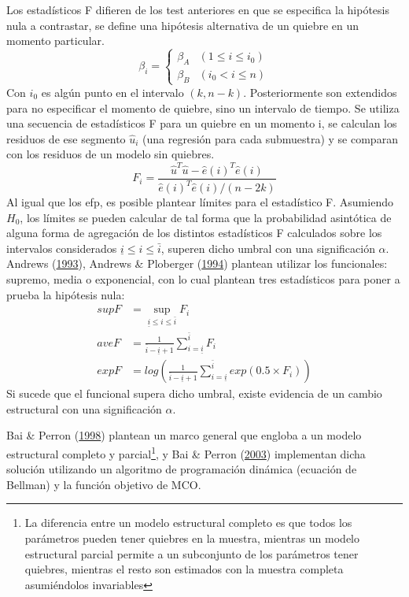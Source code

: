 \documentclass[12pt,oneside]{reedthesis}
\begin{document}
Los estadísticos F difieren de los test anteriores en que se especifica la hipótesis nula a contrastar, se define una hipótesis alternativa de un quiebre en un momento particular.
\begin{equation}
\beta_i = \begin{cases} 
\beta_A &(1 \leq i \leq i_0) \\
\beta_B &(i_0 < i \leq n)
\end{cases}
\end{equation}
Con \(i_0\) es algún punto en el intervalo \((k, n-k)\). Posteriormente son extendidos para no especificar el momento de quiebre, sino un intervalo de tiempo. Se utiliza una secuencia de estadísticos F para un quiebre en un momento i, se calculan los residuos de ese segmento \(\hat{u}_i\) (una regresión para cada submuestra) y se comparan con los residuos de un modelo sin quiebres.
\begin{equation}
F_{i} = \frac{\hat{u}^T\hat{u}-\hat{e}(i)^T\hat{e}(i)} {\hat{e}(i)^T\hat{e}(i)/(n-2k)}
\end{equation}
Al igual que los efp, es posible plantear límites para el estadístico F. Asumiendo \(H_0\), los límites se pueden calcular de tal forma que la probabilidad asintótica de alguna forma de agregación de los distintos estadísticos F calculados sobre los intervalos considerados \(\underline i \leq i \leq \bar{i}\), superen dicho umbral con una significación \(\alpha\). Andrews (\protect\hyperlink{ref-Andrews1993}{1993}), Andrews \& Ploberger (\protect\hyperlink{ref-Andrews1994}{1994}) plantean utilizar los funcionales: supremo, media o exponencial, con lo cual plantean tres estadísticos para poner a prueba la hipótesis nula:
\begin{align}
supF &= \sup_{\underline i \leq i \leq \bar{i}} F_i \\
aveF &= \frac{1}{\bar{i} - \underline i + 1}\sum_{i = \underline i}^{\bar{i}}F_i \\
expF &= log \left( \frac{1}{\bar{i}-\underline i + 1}\sum_{i = \underline i}^{\bar{i}}exp(0.5\times F_i) \right)
\end{align}
Si sucede que el funcional supera dicho umbral, existe evidencia de un cambio estructural con una significación \(\alpha\).

Bai \& Perron (\protect\hyperlink{ref-BaiPerron1998}{1998}) plantean un marco general que engloba a un modelo estructural completo y parcial\footnote{La diferencia entre un modelo estructural completo es que todos los parámetros pueden tener quiebres en la muestra, mientras un modelo estructural parcial permite a un subconjunto de los parámetros tener quiebres, mientras el resto son estimados con la muestra completa asumiéndolos invariables}, y Bai \& Perron (\protect\hyperlink{ref-BaiPerron2003}{2003}) implementan dicha solución utilizando un algoritmo de programación dinámica (ecuación de Bellman) y la función objetivo de MCO.
\end{document}
